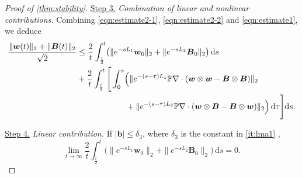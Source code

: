 \documentclass[10pt]{amsart}
\theoremstyle{plain}
\theoremstyle{definition}
\theoremstyle{remark}
\numberwithin{equation}{section}
\newcommand{\bb}{{\boldsymbol{b}}}
\newcommand{\bw}{{\boldsymbol{w}}}
\newcommand{\bB}{{\boldsymbol{B}}}
\begin{document}
\begin{proof}[Proof of \cref{thm:stability}]
\uline{Step 3.} \emph{Combination of linear and nonlinear contributions.} Combining \cref{eqn:estimate2-1}, \cref{eqn:estimate2-2} and \cref{eqn:estimate1}, we deduce 
\begin{equation}\label{eqn:estimate3}
\begin{aligned}
\frac{\|\bw(t)\|_2 + \|\bB(t)\|_2}{\sqrt{2}} 
 &\leq \frac{2}{t} \int_{\frac{t}{2}}^t \bigl( \|e^{-sL_1} \bw_{0}\|_2 + \|e^{-sL_2} \bB_0\|_2 \bigr) \, \mathrm{d} s\\
& +  \frac{2}{t} \int_{\frac{t}{2}}^{t} \Bigg[ \int_0^s \Bigl( \|e^{-(s-\tau)L_1} \mathbb{P}\nabla\cdot (\bw \otimes \bw - \bB \otimes \bB)\|_2 
\\ & \qquad \qquad \qquad  + \|e^{-(s-\tau)L_2} \mathbb{P}\nabla\cdot (\bw\otimes \bB - \bB \otimes \bw)\|_2 \Bigr) \, \mathrm{d} \tau \Bigg] \mathrm{d}s.
\end{aligned}
\end{equation}

\uline{Step 4.} \emph{Linear contribution.} If $|\bb|\le \delta_3$, where $\delta_3$ is the constant in \cref{it:lma1} ,
\[
\lim\limits_{t\to \infty} \frac{2}{t} \int_{\frac{t}{2}}^t \bigl( \|e^{-sL_1} \bw_{0}\|_2 + \|e^{-sL_2} \bB_0\|_2 \bigr) \, \mathrm{d} s=0.
\]


\end{proof}
\end{document}
